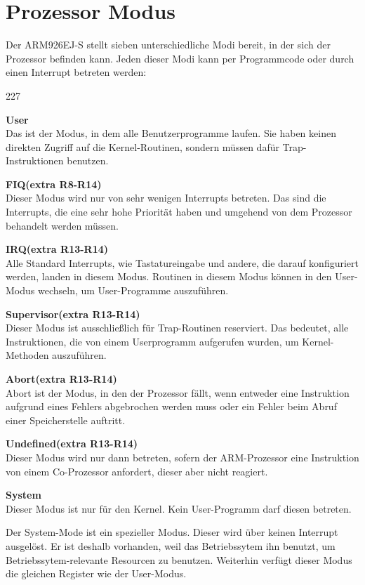 \section{Prozessor Modus}
Der ARM926EJ-S stellt sieben unterschiedliche Modi bereit, in der sich der Prozessor befinden kann. Jeden dieser Modi kann per Programmcode oder durch einen Interrupt betreten werden:
\begin{dinglist}{227}
	\item{\textbf{User} \\ Das ist der Modus, in dem alle Benutzerprogramme laufen. Sie haben keinen direkten Zugriff auf die Kernel-Routinen, sondern m\"ussen daf\"ur Trap-Instruktionen benutzen.}
	\item{\textbf{FIQ(extra R8-R14) }\\ Dieser Modus wird nur von sehr wenigen Interrupts betreten. Das sind die Interrupts, die eine sehr hohe Priorit\"at haben und umgehend von dem Prozessor behandelt werden m\"ussen.}
	\item{\textbf{IRQ(extra R13-R14)}\\ Alle Standard Interrupts, wie Tastatureingabe und andere, die darauf konfiguriert werden, landen in diesem Modus. Routinen in diesem Modus k\"onnen in den User-Modus wechseln, um User-Programme auszuf\"uhren.}
	\item{\textbf{Supervisor(extra R13-R14)} \\ Dieser Modus ist ausschlie\ss lich f\"ur Trap-Routinen reserviert. Das bedeutet, alle Instruktionen, die von einem Userprogramm aufgerufen wurden, um Kernel-Methoden auszuf\"uhren.}
	\item{\textbf{Abort(extra R13-R14)}\\ Abort ist der Modus, in den der Prozessor f\"allt, wenn entweder eine Instruktion aufgrund eines Fehlers abgebrochen werden muss oder ein Fehler beim Abruf einer Speicherstelle auftritt.}
	\item{\textbf{Undefined(extra R13-R14)}\\ Dieser Modus wird nur dann betreten, sofern der ARM-Prozessor eine Instruktion von einem Co-Prozessor anfordert, dieser aber nicht reagiert.}
	\item{\textbf{System} \\ Dieser Modus ist nur f\"ur den Kernel. Kein User-Programm darf diesen betreten.}
\end{dinglist}
Der System-Mode ist ein spezieller Modus. Dieser wird \"uber keinen Interrupt ausgel\"ost. Er ist deshalb vorhanden, weil das Betriebssytem ihn benutzt, um Betriebssytem-relevante Resourcen zu benutzen. Weiterhin verf\"ugt dieser Modus die gleichen Register wie der User-Modus.
